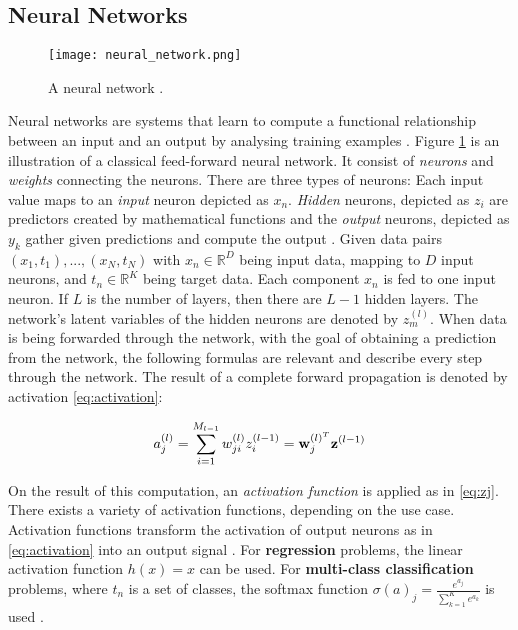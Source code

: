 \subsection{Neural Networks \label{sec:neural-networks}}
\begin{figure}[h]
  \centering
  \texttt{[image: neural\_network.png]}\\
  \caption{A neural network \cite{hallmachinelearning}.}
  \label{fig:neural_network}
\end{figure}
Neural networks are systems that learn to compute a functional relationship between an input and an output by analysing training examples \cite{sibi2013analysis}. Figure \ref{fig:neural_network} is an illustration of a classical feed-forward neural network. It consist of \textit{neurons} and \textit{weights} connecting the neurons. There are three types of neurons: Each input value maps to an \textit{input} neuron depicted as $x_n$. \textit{Hidden} neurons, depicted as $z_i$ are predictors created by mathematical functions and the \textit{output} neurons, depicted as $y_k$ gather given predictions and compute the output \cite{hallmachinelearning}. Given data pairs $(x_1, t_1), ..., (x_N, t_N)$ with $x_n \in \mathbb{R}^D$ being input data, mapping to $D$ input neurons, and $t_n \in \mathbb{R}^K$ being target data. Each component $x_n$ is fed to one input neuron. If $L$ is the number of layers, then there are $L-1$ hidden layers. The network's latent variables of the hidden neurons are denoted by $z_m^{(l)}$. When data is being forwarded through the network, with the goal of obtaining a prediction from the network, the following formulas are relevant and describe every step through the network. The result of a complete forward propagation is denoted by activation \ref{eq:activation}:

\begin{equation}\label{eq:activation}
	a_j^{(l)} = \sum_{i=1}^{M_{l-1}}w_{ji}^{(l)}z_i^{(l-1)} = \bold{w}_j^{(l)^T} \bold{z}^{(l-1)}	
\end{equation}

On the result of this computation, an \textit{activation function} is applied as in \ref{eq:zj}. There exists a variety of activation functions, depending on the use case. Activation functions transform the activation of output neurons as in \ref{eq:activation} into an output signal \cite{sibi2013analysis}. For \textbf{regression} problems, the linear activation function $h(x)=x$ can be used. For \textbf{multi-class classification} problems, where $t_n$ is a set of classes, the softmax function $\sigma(a)_j= \frac{e^{a_j}}{\sum_{k=1}^Ke^{a_k}}$ is used \cite{hallmachinelearning}.

